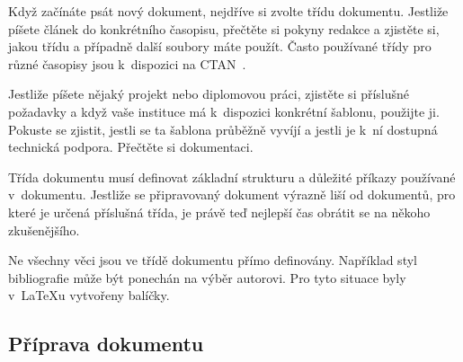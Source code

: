 \documentclass{csbulletin}
\begin{document}
Když začínáte psát nový dokument, nejdříve si zvolte třídu dokumentu. Jestliže píšete článek do konkrétního časopisu, přečtěte si pokyny redakce a zjistěte si, jakou třídu a případně další soubory máte použít. Často používané třídy pro různé časopisy jsou k~dispozici na CTAN~\cite{ctansearch}.

Jestliže píšete nějaký projekt nebo diplomovou práci, zjistěte si příslušné požadavky a když vaše instituce má k~dispozici konkrétní šablonu, použijte ji. Pokuste se zjistit, jestli se ta šablona průběžně vyvíjí a jestli je k~ní dostupná technická podpora. Přečtěte si dokumentaci.

Třída dokumentu musí definovat základní strukturu a důležité příkazy používané v~dokumentu. Jestliže se připravovaný dokument výrazně liší od dokumentů, pro které je určená příslušná třída, je právě teď nejlepší čas obrátit se na někoho zkušenějšího.

Ne všechny věci jsou ve třídě dokumentu přímo definovány. Například styl bibliografie může být ponechán na výběr autorovi. Pro tyto situace byly v~\LaTeX u vytvořeny balíčky.

\subsection{Příprava dokumentu}
\end{document}
